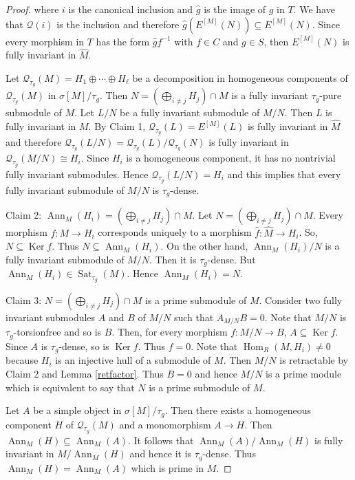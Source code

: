 \documentclass{amsart}
\theoremstyle{definition}
\theoremstyle{remark}
\numberwithin{equation}{section}
\DeclareMathOperator{\Ann}{Ann}
\DeclareMathOperator{\Ker}{Ker}
\DeclareMathOperator{\Hom}{Hom}
\DeclareMathOperator{\Sat}{Sat}
\newcommand{\sm}{\sigma[M]}
\begin{document}
\begin{proof}
		where $i$ is the canonical inclusion and $\hat{g}$ is the image of $g$ in $T$. We have that $\mathcal{Q}(i)$ is the inclusion and therefore $\hat{g}\left(E^{[M]}(N)\right)\subseteq E^{[M]}(N)$. Since every morphism in $T$ has the form $\hat{g}f^{-1}$ with $f\in C$ and $g\in S$, then $E^{[M]}(N)$ is fully invariant in $\widehat{M}$.
		
		Let $\mathcal{Q}_{\tau_g}(M)=H_1\oplus\cdots\oplus H_\ell$ be a decomposition in homogeneous components of $\mathcal{Q}_{\tau_g}(M)$ in $\sm/\tau_g$. Then $N=\left(\bigoplus_{i\neq j}H_j\right)\cap M$ is a fully invariant $\tau_g$-pure submodule of $M$. Let $L/N$ be a fully invariant submodule of $M/N$. Then $L$ is fully invariant in $M$. By Claim 1, $\mathcal{Q}_{\tau_g}(L)=E^{[M]}(L)$ is fully invariant in $\widehat{M}$ and therefore $\mathcal{Q}_{\tau_g}(L/N)=\mathcal{Q}_{\tau_g}(L)/\mathcal{Q}_{\tau_g}(N)$ is fully invariant in $\mathcal{Q}_{\tau_g}(M/N)\cong H_i$. Since $H_i$ is a homogeneous component, it has no nontrivial fully invariant submodules. Hence $\mathcal{Q}_{\tau_g}(L/N)=H_i$ and this implies that every fully invariant submodule of $M/N$ is $\tau_g$-dense.
		
		Claim 2: $\Ann_M(H_i)=\left(\bigoplus_{i\neq j}H_j\right)\cap M$. Let $N=\left(\bigoplus_{i\neq j}H_j\right)\cap M$. Every morphism $f:M\to H_i$ corresponds uniquely to a morphism $\hat{f}:\widehat{M}\to H_i$. So, $N\subseteq \Ker f$. Thus $N\subseteq\Ann_M(H_i)$. On the other hand, $\Ann_M(H_i)/N$ is a fully invariant submodule of $M/N$. Then it is $\tau_g$-dense. But $\Ann_M(H_i)\in\Sat_{\tau_g}(M)$. Hence $\Ann_M(H_i)=N$.
		
		Claim 3: $N=\left(\bigoplus_{i\neq j}H_j\right)\cap M$ is a prime submodule of $M$. Consider two fully invariant submodules $A$ and $B$ of $M/N$ such that $A_{M/N} B=0$. Note that $M/N$ is $\tau_g$-torsionfree and so is $B$. Then, for every morphism $f:M/N\to B$, $A\subseteq \Ker f$. Since $A$ is $\tau_g$-dense, so is $\Ker f$. Thus $f=0$. Note that $\Hom_R(M,H_i)\neq 0$ because $H_i$ is an injective hull of a submodule of $M$. Then $M/N$ is retractable by Claim 2 and Lemma \ref{retfactor}. Thus $B=0$ and hence $M/N$ is a prime module which is equivalent to say that $N$ is a prime submodule of $M$.
		
		Let $A$ be a simple object in $\sm/\tau_g$. Then there exists a homogeneous component $H$ of $\mathcal{Q}_{\tau_g}(M)$ and a monomorphism $A\to H$. Then $\Ann_M(H)\subseteq \Ann_M(A)$. It follows that $\Ann_M(A)/\Ann_M(H)$ is fully invariant in $M/\Ann_M(H)$ and hence it is $\tau_g$-dense. Thus $\Ann_M(H)=\Ann_M(A)$ which is prime in $M$.
		

\end{proof}
\end{document}

